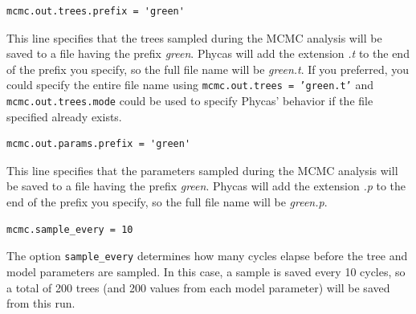 \documentclass[10pt]{article}
\newcommand{\pathname}[1]{{\em #1}}			%
\newcommand{\code}[1]{{\tt #1}}				%
\newcommand{\opt}[1]{{\tt \small #1}\index{#1}}		%
\begin{document}
\begin{samepage}
\begin{verbatim}
mcmc.out.trees.prefix = 'green'
\end{verbatim}
This line specifies that the trees sampled during the MCMC analysis will be saved to a file having the prefix \pathname{green}. Phycas will add the extension \pathname{.t} to the end of the prefix you specify, so the full file name will be \pathname{green.t}. If you preferred, you could specify the entire file name using \code{mcmc.out.trees = 'green.t'} and \code{mcmc.out.trees.mode} could be used to specify Phycas' behavior if the file specified already exists.
\end{samepage}

\begin{samepage}
\begin{verbatim}
mcmc.out.params.prefix = 'green'
\end{verbatim}
This line specifies that the parameters sampled during the MCMC analysis will be saved to a file having the prefix \pathname{green}. Phycas will add the extension \pathname{.p} to the end of the prefix you specify, so the full file name will be \pathname{green.p}. 
\end{samepage}


\begin{samepage}
\begin{verbatim}
mcmc.sample_every = 10
\end{verbatim}
The option \opt{sample\_every} determines how many cycles elapse before the tree and model parameters are sampled. In this case, a sample is saved every 10 cycles, so a total of 200 trees (and 200 values from each model parameter) will be saved from this run.
\end{samepage}
\end{document}
